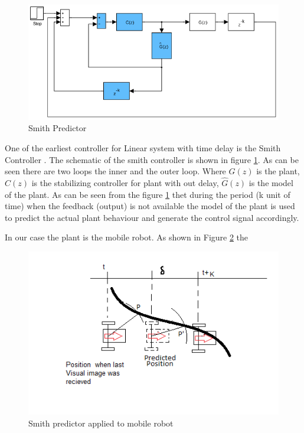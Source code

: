  \begin{figure}
 	\includegraphics[width=\linewidth]{Chapter7/fig/Smith_predictor}
 	\caption{Smith Predictor}
 	\label{fig:Smith}
 \end{figure}
 
 One of the earliest controller for Linear system with time delay is the Smith Controller \cite{smith1959controller}. The schematic of the smith controller is shown in figure \ref{fig:Smith}. As can be seen there are two loops the inner and the outer loop. Where $G(z)$ is the plant, $C(z)$ is the stabilizing controller  for plant with out delay, $\hat{G}(z)$ is the model of the plant. 
 As can be seen from the figure \ref{fig:Smith} thet during the period (k unit of time) when the feedback (output) is not available the model of the plant is used to predict the actual plant behaviour and generate the control signal accordingly. 
 
 In our case the plant is the mobile robot. As shown in Figure \ref{fig:SmithRobot} the 

  
 \begin{figure}
 	\includegraphics{Chapter7/fig/robotPredictPos}
 	\caption{Smith predictor applied to mobile robot}
 	\label{fig:SmithRobot}
 \end{figure}
  
